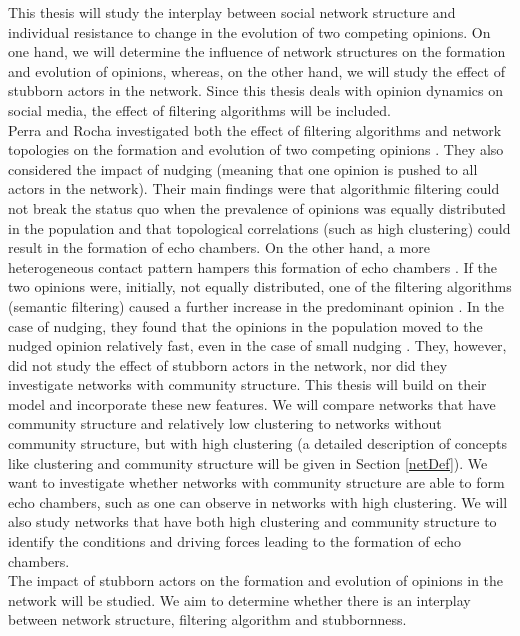 \documentclass[11 pt , letterpaper , twoside , openright]{book}
\begin{document}
This thesis will study the interplay between social network structure and individual resistance to change in the evolution of two competing opinions. On one hand, we will determine the influence of network structures on the formation and evolution of opinions, whereas, on the other hand, we will study the effect of stubborn actors in the network. Since this thesis deals with opinion dynamics on social media, the effect of filtering algorithms will be included.\\ 
\newline
Perra and Rocha investigated both the effect of filtering algorithms and network topologies on the formation and evolution of two competing opinions \cite{Perra2019}. They also considered the impact of nudging (meaning that one opinion is pushed to all actors in the network). Their main findings were that algorithmic filtering could not break the status quo when the prevalence of opinions was equally distributed in the population and that topological correlations (such as high clustering) could result in the formation of echo chambers. On the other hand, a more heterogeneous contact pattern hampers this formation of echo chambers \cite{Perra2019}. If the two opinions were, initially, not equally distributed, one of the filtering algorithms (semantic filtering) caused a further increase in the predominant opinion \cite{Perra2019}. In the case of nudging, they found that the opinions in the population moved to the nudged opinion relatively fast, even in the case of small nudging \cite{Perra2019}. They, however, did not study the effect of stubborn actors in the network, nor did they investigate networks with community structure. This thesis will build on their model and incorporate these new features. We will compare networks that have community structure and relatively low clustering to networks without community structure, but with high clustering (a detailed description of concepts like clustering and community structure will be given in Section \ref{netDef}). We want to investigate whether networks with community structure are able to form echo chambers, such as one can observe in networks with high clustering. We will also study networks that have both high clustering and community structure to identify the conditions and driving forces leading to the formation of echo chambers.\\
\newline
The impact of stubborn actors on the formation and evolution of opinions in the network will be studied. We aim to determine whether there is an interplay between network structure, filtering algorithm and stubbornness.
\end{document}
